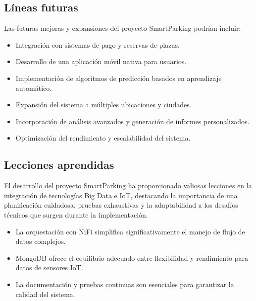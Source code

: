 \documentclass{../../../miPlantilla}
\begin{document}
\subsection{Líneas futuras}
Las futuras mejoras y expansiones del proyecto SmartParking podrían incluir:
\begin{itemize}
  \item Integración con sistemas de pago y reservas de plazas.
  \item Desarrollo de una aplicación móvil nativa para usuarios.
  \item Implementación de algoritmos de predicción basados en aprendizaje automático.
  \item Expansión del sistema a múltiples ubicaciones y ciudades.
  \item Incorporación de análisis avanzados y generación de informes personalizados.
  \item Optimización del rendimiento y escalabilidad del sistema.
\end{itemize}

\subsection{Lecciones aprendidas}
El desarrollo del proyecto SmartParking ha proporcionado valiosas lecciones en la integración de tecnologías Big Data e IoT,
destacando la importancia de una planificación cuidadosa, pruebas exhaustivas y la adaptabilidad a los desafíos técnicos que surgen durante la implementación.

\begin{itemize}
  \item La orquestación con NiFi simplifica significativamente el manejo de flujo de datos complejos.
  \item MongoDB ofrece el equilibrio adecuado entre flexibilidad y rendimiento para datos de sensores IoT.
  \item La documentación y pruebas continuas son esenciales para garantizar la calidad del sistema.
\end{itemize}
\end{document}
